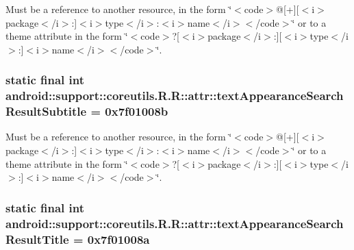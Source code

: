 Must be a reference to another resource, in the form \char`\"{}$<$code$>$@\mbox{[}+\mbox{]}\mbox{[}$<$i$>$package$<$/i$>$:\mbox{]}$<$i$>$type$<$/i$>$:$<$i$>$name$<$/i$>$$<$/code$>$\char`\"{} or to a theme attribute in the form \char`\"{}$<$code$>$?\mbox{[}$<$i$>$package$<$/i$>$:\mbox{]}\mbox{[}$<$i$>$type$<$/i$>$:\mbox{]}$<$i$>$name$<$/i$>$$<$/code$>$\char`\"{}. \hypertarget{classandroid_1_1support_1_1coreutils_1_1_r_1_1attr_dd92587e1790df831aa81efe9cac7042}{
\subsubsection[{textAppearanceSearchResultSubtitle}]{\setlength{\rightskip}{0pt plus 5cm}static final int android::support::coreutils.R.R::attr::textAppearanceSearchResultSubtitle = 0x7f01008b}}
\label{classandroid_1_1support_1_1coreutils_1_1_r_1_1attr_dd92587e1790df831aa81efe9cac7042}


Must be a reference to another resource, in the form \char`\"{}$<$code$>$@\mbox{[}+\mbox{]}\mbox{[}$<$i$>$package$<$/i$>$:\mbox{]}$<$i$>$type$<$/i$>$:$<$i$>$name$<$/i$>$$<$/code$>$\char`\"{} or to a theme attribute in the form \char`\"{}$<$code$>$?\mbox{[}$<$i$>$package$<$/i$>$:\mbox{]}\mbox{[}$<$i$>$type$<$/i$>$:\mbox{]}$<$i$>$name$<$/i$>$$<$/code$>$\char`\"{}. \hypertarget{classandroid_1_1support_1_1coreutils_1_1_r_1_1attr_f8b8bc98235454f72f5c3c0c41fdabc6}{
\subsubsection[{textAppearanceSearchResultTitle}]{\setlength{\rightskip}{0pt plus 5cm}static final int android::support::coreutils.R.R::attr::textAppearanceSearchResultTitle = 0x7f01008a}}
\label{classandroid_1_1support_1_1coreutils_1_1_r_1_1attr_f8b8bc98235454f72f5c3c0c41fdabc6}


